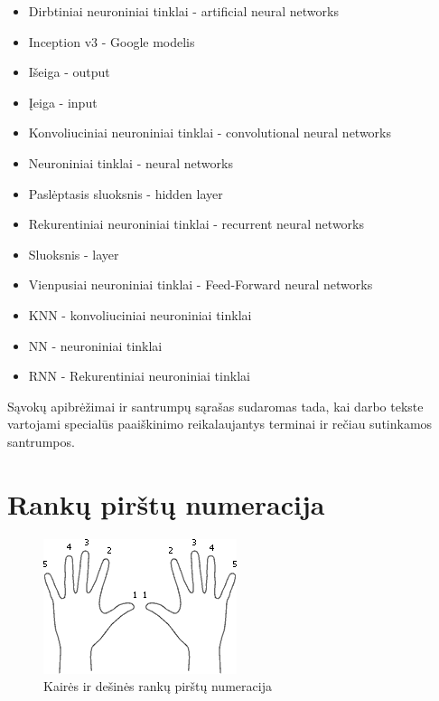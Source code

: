 \documentclass{VUMIFPSbakalaurinis}
\begin{document}

\begin{itemize}
	\item Dirbtiniai neuroniniai tinklai - artificial neural networks
	\item Inception v3 - Google modelis
	\item Išeiga - output
	\item Įeiga - input
	\item Konvoliuciniai neuroniniai tinklai - convolutional neural networks
	\item Neuroniniai tinklai - neural networks
	\item Paslėptasis sluoksnis - hidden layer
	\item Rekurentiniai neuroniniai tinklai - recurrent neural networks
	\item Sluoksnis - layer
	\item Vienpusiai neuroniniai tinklai - Feed-Forward neural networks
\end{itemize}

\begin{itemize}
	\item KNN - konvoliuciniai neuroniniai tinklai
	\item NN - neuroniniai tinklai
	\item RNN - Rekurentiniai neuroniniai tinklai
	
\end{itemize}

Sąvokų apibrėžimai ir santrumpų sąrašas sudaromas tada, kai darbo tekste
vartojami specialūs paaiškinimo reikalaujantys terminai ir rečiau sutinkamos
santrumpos.

\appendix  %

\section{Rankų pirštų numeracija}
\label{appendix:pirstai}
\begin{figure}[H]
    \centering
    \includegraphics[scale=1]{img/fingers}
    \caption{Kairės ir dešinės rankų pirštų numeracija}
    \label{img:fingers}
\end{figure}
\end{document}

